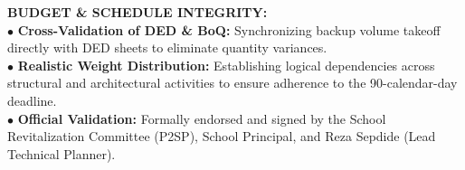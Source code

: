 \documentclass[10pt,a4paper,landscape]{article}
\begin{document}
\begin{minipage}[t]{0.30\linewidth}
  \begin{tcolorbox}[sharp corners, boxrule=0.6pt, colframe=pnavy, colback=pbglight, left=2.5mm, right=2.5mm, top=2mm, bottom=2mm, height=54mm]
    {\fontsize{7pt}{8.5pt}\selectfont\bfseries\color{pnavy}BUDGET \& SCHEDULE INTEGRITY:}\\[1.5mm]
    {\fontsize{6.5pt}{8.2pt}\selectfont\color{psteel}
    $\bullet$ \textbf{Cross-Validation of DED \& BoQ:} Synchronizing backup volume takeoff directly with DED sheets to eliminate quantity variances.\\
    $\bullet$ \textbf{Realistic Weight Distribution:} Establishing logical dependencies across structural and architectural activities to ensure adherence to the 90-calendar-day deadline.\\
    $\bullet$ \textbf{Official Validation:} Formally endorsed and signed by the School Revitalization Committee (P2SP), School Principal, and Reza Sepdide (Lead Technical Planner).
    }
  \end{tcolorbox}
\end{minipage}%
\hfill
\end{document}
